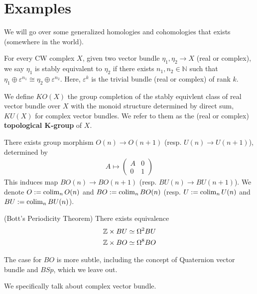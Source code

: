\section{Examples}\label{sec:preliminary-examples}
We will go over some generalized homologies and cohomologies that exists (somewhere in the world).

\begin{definition}
\cite{PreSwitzer}
 For every CW complex $X$, given two vector bundle $\eta_1, \eta_2 \to X$ (real or complex), we say $\eta_1$ is stably equivalent to $\eta_2$ if there exists $n_1, n_2\in \mathbb{N}$ such that $\eta_1\oplus \varepsilon ^{n_1}\cong \eta_2\oplus \varepsilon ^{n_2}$. Here, $\varepsilon^k$ is the trivial bundle (real or complex) of rank $k$.

  We define $KO(X)$ the group completion of the stably equivlent class of real vector bundle over $X$ with the monoid structure determined by direct sum, $KU(X)$ for complex vector bundles. We refer to them as the (real or complex) \textbf{topological K-group} of $X$.
\end{definition}

\begin{definition}
    There exists group morphism $O(n)\to O(n+1)$ (resp. $U(n)\to U(n+1)$), determined by 
    \begin{align*}
    A\mapsto \begin{pmatrix}
    A & 0
    \\ 0 & 1
    \end{pmatrix}
    \end{align*}
    This induces map $BO(n)\to BO(n+1)$ (resp. $BU(n)\to BU(n+1)$). We denote $O:=\operatorname{colim}_n O(n)$ and $BO:=\operatorname{colim} _n BO(n)$ (resp. $U:=\operatorname{colim}_n U(n)$ and $BU:=\operatorname{colim}_n BU(n)$).
\end{definition}

\begin{theorem}(Bott's Periodicity Theorem)
\cite{PreBottPeriodicity}\cite{PreSwitzer}
  There exists equivalence
  \begin{align*}
  \mathbb{Z}\times BU\simeq \Omega^2 BU
  \\ \mathbb{Z} \times BO \simeq \Omega^ 8 BO
  \end{align*}
\end{theorem}
The case for $BO$ is more subtle, including the concept of Quaternion vector bundle and $BSp$, which we leave out.

We specifically talk about complex vector bundle. 

